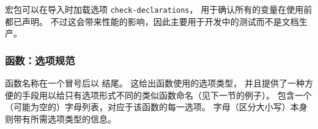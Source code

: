 \documentclass{l3doc}
\begin{document}
%
 宏包可以在导入时加载选项 \texttt{check-declarations}，
用于确认所有的变量在使用前都已声明。
不过这会带来性能的影响，因此主要用于开发中的测试而不是文档生产。

%
\subsubsection{函数：选项规范}

%
函数名称在一个冒号后以  结尾。
这给出函数使用的选项类型，
并且提供了一种方便的手段用以给只有选项形式不同的类似函数命名（见下一节的例子）。
%
 包含一个（可能为空的）字母列表，对应于该函数的每一选项。
字母（区分大小写）本身则带有所需选项类型的信息。
\end{document}
